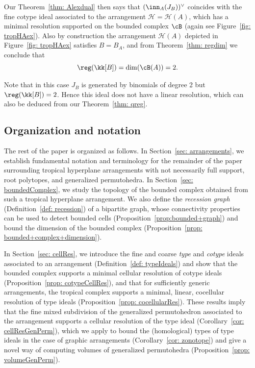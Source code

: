 Our Theorem~\ref{thm: Alexdual} then says that $(\inn_A(J_B))^\vee$ coincides with the fine cotype ideal associated to the arrangement ${\mathcal H} = {\mathcal H}(A)$, which has a minimal resolution supported on the bounded complex $\cB$ (again see Figure~\ref{fig: tropHAex}). Also by construction the arrangement ${\mathcal H}(A)$ depicted in Figure~\ref{fig: tropHAex} satisfies $B = B_A$, and from Theorem~\ref{thm: regdim} we conclude that
\[\reg(\kk[B]) = \dim(\cB(A)) = 2.\]

Note that in this case $J_B$ is generated by binomials of degree 2 but $\reg(\kk[B]) = 2$.  Hence this ideal does not have a linear resolution, which can also be deduced from our Theorem~\ref{thm: qreg}.

\subsection{Organization and notation}

The rest of the paper is organized as follows. In Section~\ref{sec: arrangements}, we establish fundamental notation and terminology for the remainder of the paper surrounding tropical hyperplane arrangements with not necessarily full support, root polytopes, and generalized permutohedra. In Section~\ref{sec: boundedComplex}, we study the topology of the bounded complex obtained from such a tropical hyperplane arrangement. We also define the \textit{recession graph} (Definition~\ref{def: recession}) of a bipartite graph, whose connectivity properties can be used to detect bounded cells (Proposition~\ref{prop:bounded+graph}) and bound the dimension of the bounded complex (Proposition~\ref{prop: bounded+complex+dimension}). 

In Section~\ref{sec: cellRes}, we introduce the fine and coarse \textit{type} and \textit{cotype} ideals associated to an arrangement (Definition~\ref{def: typeIdeals}) and show that the bounded complex supports a minimal cellular resolution of cotype ideals (Proposition~\ref{prop: cotypeCellRes}), and that for sufficiently generic arrangements, the tropical complex supports a minimal, linear, cocellular resolution of type ideals (Proposition~\ref{prop: cocellularRes}). These results imply that the fine mixed subdivision of the generalized permutohedron associated to the arrangement supports a cellular resolution of the type ideal (Corollary~\ref{cor: cellResGenPerm}), which we apply to bound the (homological) types of type ideals in the case of graphic arrangements (Corollary~\ref{cor: zonotope}) and give a novel way of computing volumes of generalized permutohedra (Proposition~\ref{prop: volumeGenPerm}).

